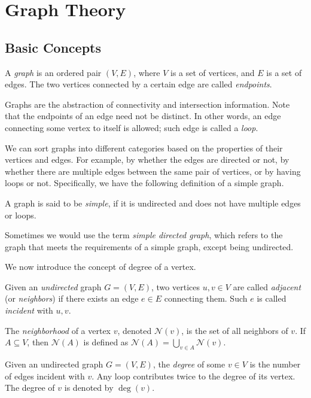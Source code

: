 \chapter{Graph Theory}
\section{Basic Concepts}
\begin{definition}[Graph]
    A \emph{graph} is an ordered pair $(V, E)$, where $V$ is a set of vertices, and $E$ is a set of edges. The two vertices connected by a certain edge are called \emph{endpoints}. 
\end{definition}

Graphs are the abstraction of connectivity and intersection information. Note that the endpoints of an edge need not be distinct. In other words, an edge connecting some vertex to itself is allowed; such edge is called a \emph{loop}. 

We can sort graphs into different categories based on the properties of their vertices and edges. For example, by whether the edges are directed or not, by whether there are multiple edges between the same pair of vertices, or by having loops or not. Specifically, we have the following definition of a simple graph. 

\begin{definition}
    A graph is said to be \emph{simple}, if it is undirected and does not have multiple edges or loops.
\end{definition}

Sometimes we would use the term \emph{simple directed graph}, which refers to the graph that meets the requirements of a simple graph, except being undirected. 

We now introduce the concept of degree of a vertex.

\begin{definition}
    Given an \emph{undirected} graph $G=(V,E)$, two vertices $u,v\in V$ are called \emph{adjacent} (or \emph{neighbors}) if there exists an edge $e\in E$ connecting them. Such $e$ is called \emph{incident} with $u,v$. 

    The \emph{neighborhood} of a vertex $v$, denoted $\mathcal{N}(v)$, is the set of all neighbors of $v$. If $A\subseteq V$, then $\mathcal{N}(A)$ is defined as $\displaystyle\mathcal{N}(A)=\bigcup_{v\in A}\mathcal{N}(v)$. 
\end{definition}

\begin{definition}[Degree]
    Given an undirected graph $G=(V,E)$, the \emph{degree} of some $v\in V$ is the number of edges incident with $v$. Any loop contributes twice to the degree of its vertex. The degree of $v$ is denoted by $\deg(v)$.
\end{definition}


